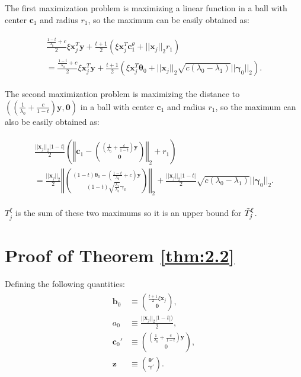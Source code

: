 The first maximization problem is maximizing a linear function in a ball with center $\boldsymbol c_1$ and radius $r_1$, so the maximum can be easily obtained as:

\begin{gather}
    \begin{aligned}
        \frac{\frac{1-t}{\lambda_0}+c}{2}\xi\boldsymbol x_j^T \boldsymbol y+\frac{t+1}{2}\left(\xi \boldsymbol x_j^T \boldsymbol c_1^\theta+||\boldsymbol x_j||_2r_1\right)\\
        =\frac{\frac{1-t}{\lambda_0}+c}{2}\xi\boldsymbol x_j^T \boldsymbol y+\frac{t+1}{2}\left(\xi \boldsymbol x_j^T \boldsymbol \theta_{0}+||\boldsymbol x_j||_2\sqrt{c(\lambda_0-\lambda_1)}||\boldsymbol\gamma_{0}||_2\right).
    \end{aligned}
\end{gather}

The second maximization problem is maximizing the distance to $\left((\frac{1}{\lambda_0}+\frac{c}{1-t})\boldsymbol y,\boldsymbol 0\right)$ in a ball with center $\boldsymbol c_1$ and radius $r_1$, so the maximum can also be easily obtained as:

\begin{gather}
    \begin{aligned}
        \frac{||\boldsymbol x_j||_2|1-t|}{2}\left(\left\Vert\boldsymbol c_1-\binom{(\frac{1}{\lambda_0}+\frac{c}{1-t})\boldsymbol y}{\boldsymbol 0}\right\Vert_2+r_1\right)\\
        =\frac{||\boldsymbol x_j||_2}{2}\left\Vert\binom{(1-t)\boldsymbol\theta_{0}-\left(\frac{1-t}{\lambda_0}+c\right)\boldsymbol y}{(1-t)\sqrt{\frac{\lambda_1}{\lambda_0}}\boldsymbol\gamma_{0}}\right\Vert_2+\frac{||\boldsymbol x_j||_2|1-t|}{2}\sqrt{c(\lambda_0-\lambda_1)}||\boldsymbol\gamma_0||_2.
    \end{aligned}
\end{gather}

$T^\xi_j$ is the sum of these two maximums so it is an upper bound for $\Tilde{T}^\xi_j$.

\iffalse
\section{Proof of Theorem \ref{thm:2.2}}

Defining the following quantities:
\begin{gather}
    \begin{aligned}
        \boldsymbol b_0&\equiv\binom{\frac{t+1}{2}\xi \boldsymbol x_j}{\boldsymbol 0},\\
        a_0&\equiv\frac{||\boldsymbol x_j||_2|1-t|)}{2},\\
        \boldsymbol c_0'&\equiv\binom{\left(\frac{1}{\lambda_0}+\frac{c}{1-t}\right)\boldsymbol y}{0},\\
        \boldsymbol z &\equiv \binom{\boldsymbol\theta'}{\boldsymbol\gamma'}.
    \end{aligned}
\end{gather}

